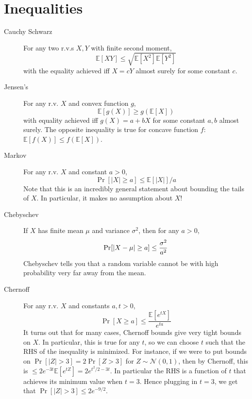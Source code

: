 \documentclass[11pt]{article}
\theoremstyle{definition}
\theoremstyle{remark}
\newcommand{\E}[1]{\mathbb{E}\left[ #1 \right]}
\newcommand{\Norm}{\mathcal{N}}
\begin{document}
\section{Inequalities}

\begin{description}

    \item[Cauchy Schwarz]
    
    For any two r.v.s $X,Y$ with finite second moment, $$\E{XY} \leq \sqrt{\E{X^2}\E{Y^2}} $$ with the equality achieved iff $X = cY$ almost surely for some constant $c$.
    
    \item[Jensen's]
    
    For any r.v. $X$ and convex function $g$, $$ \E{g(X)} \geq g(\E{X})$$ with equality achieved iff $g(X) = a + b X$ for some constant $a,b$ almost surely. The opposite inequality is true for concave function $f$: $\E{f(X)} \leq f(\E{X})$. 

    \item[Markov]
    
    For any r.v. $X$ and constant $a > 0$, $$ \Pr[ |X| \geq a ] \leq \E{|X|} / a $$ Note that this is an incredibly general statement about bounding the tails of $X$. In particular, it makes no assumption about $X$! 
    
    \item[Chebyschev] If $X$ has finite mean $\mu$ and variance $\sigma^2$, then for any $a > 0$, $$\Pr[\abs{ X - \mu} \geq a] \leq \frac{\sigma^2}{a^2} $$ Chebyschev tells you that a random variable cannot be with high probability very far away from the mean. 
    
    \item[Chernoff]

    For any r.v. $X$ and constants $a, t > 0$, $$\Pr[ X \geq a ] \leq \frac{\E{e^{tX}}}{e^{ta}} $$ It turns out that for many cases, Chernoff bounds give very tight bounds on $X$. In particular, this is true for any $t$, so we can choose $t$ such that the RHS of the inequality is minimized. For instance, if we were to put bounds on $\Pr[|Z| > 3] = 2 \Pr[Z > 3]$ for $Z \sim \Norm(0,1)$, then by Chernoff, this is $\leq 2 e^{-3t} \E{e^{tZ}} = 2 e^{t^2/2-3t}$. In particular the RHS is a function of $t$ that achieves its minimum value when $t=3$. Hence plugging in $t=3$, we get that $\Pr[|Z|>3] \leq 2e^{-9/2}$.  

\end{description}
\end{document}
